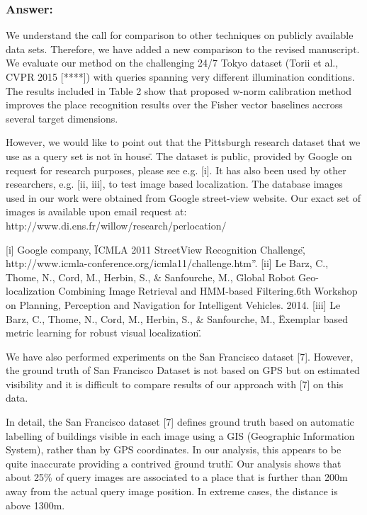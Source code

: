 \documentclass[a4paper,12pt]{article}
\begin{document}
\subsubsection*{Answer:}
We understand the call for comparison to other techniques on publicly available data sets. Therefore, we have added a new comparison to the revised manuscript. We evaluate our method on the challenging 24/7 Tokyo dataset (Torii et al., CVPR 2015 [****]) with queries spanning very different illumination conditions.  The results included in Table 2 show that proposed w-norm calibration method improves the place recognition results over the Fisher vector baselines accross several target dimensions.

However, we would like to point out that the Pittsburgh research dataset that we use as a query set is not \"in house\". The dataset is public, provided by Google on request for research purposes, please see e.g.  [i]. It has also been used by other researchers, e.g. [ii, iii], to test image based localization. The database images used in our work were obtained from Google street-view website. Our exact set of images is available upon email request at: http://www.di.ens.fr/willow/research/perlocation/

 [i] Google company, \"ICMLA 2011 StreetView Recognition Challenge\", http://www.icmla-conference.org/icmla11/challenge.htm”.
 [ii] Le Barz, C., Thome, N., Cord, M., Herbin, S., \& Sanfourche, M., \"Global Robot Geo-localization Combining Image Retrieval and HMM-based Filtering.\" 6th Workshop on Planning, Perception and Navigation for Intelligent Vehicles. 2014.
 [iii] Le Barz, C., Thome, N., Cord, M., Herbin, S., \& Sanfourche, M., \"Exemplar based metric learning for robust visual localization\".

We have also performed experiments on the San Francisco dataset [7]. However, the ground truth of San Francisco Dataset is not based on GPS but on estimated visibility and it is difficult to compare results of our approach with [7] on this data.

In detail, the San Francisco dataset [7] defines ground truth based on automatic labelling of buildings visible in each image using a GIS (Geographic Information System), rather than by GPS coordinates. In our analysis, this appears to be quite inaccurate providing a contrived \"ground truth\". Our analysis shows that about 25\% of query images are associated to a place that is further than 200m away from the actual query image position. In extreme cases, the distance is above 1300m. 
\end{document}
